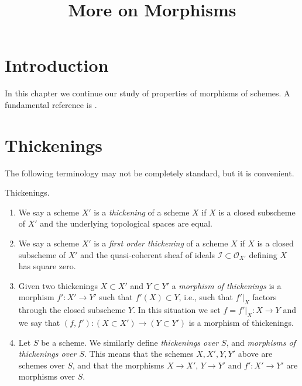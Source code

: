 

%


\title{More on Morphisms}


\maketitle

\label{section-phantom}

\tableofcontents

\section{Introduction}
\label{section-introduction}

\noindent
In this chapter we continue our study of properties of morphisms of schemes.
A fundamental reference is \cite{EGA}.






\section{Thickenings}
\label{section-thickenings}

\noindent
The following terminology may not be completely standard, but it is convenient.

\begin{definition}
\label{definition-thickening}
Thickenings.
\begin{enumerate}
\item We say a scheme $X'$ is a {\it thickening} of a scheme $X$ if
$X$ is a closed subscheme of $X'$ and the underlying topological spaces
are equal.
\item We say a scheme $X'$ is a {\it first order thickening} of a scheme $X$ if
$X$ is a closed subscheme of $X'$ and the quasi-coherent sheaf of ideals
$\mathcal{I} \subset \mathcal{O}_{X'}$ defining $X$ has square zero.
\item Given two thickenings $X \subset X'$ and $Y \subset Y'$ a
{\it morphism of thickenings} is a morphism $f' : X' \to Y'$ such that
$f'(X) \subset Y$, i.e., such that $f'|_X$ factors through the closed
subscheme $Y$. In this situation we set $f = f'|_X : X \to Y$ and we say
that $(f, f') : (X \subset X') \to (Y \subset Y')$ is a morphism of
thickenings.
\item Let $S$ be a scheme. We similarly define {\it thickenings over $S$}, and
{\it morphisms of thickenings over $S$}. This means that the schemes
$X, X', Y, Y'$ above are schemes over $S$, and that the morphisms
$X \to X'$, $Y \to Y'$ and $f' : X' \to Y'$ are morphisms over $S$.
\end{enumerate}
\end{definition}

